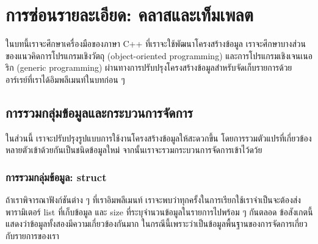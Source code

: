 \chapter{การ{\wbr}ซ่อน{\wbr}รายละเอียด: ค{\wbr}ลา{\wbr}ส{\wbr}และ{\wbr}เท็ม{\wbr}เพล{\wbr}ต}

ใน{\wbr}บท{\wbr}นี้{\wbr}เรา{\wbr}จะ{\wbr}ศึกษา{\wbr}เครื่องมือ{\wbr}ของ{\wbr}ภาษา C++ ที่{\wbr}เรา{\wbr}จะ{\wbr}ใช้{\wbr}พัฒนา{\wbr}โครงสร้าง{\wbr}ข้อมูล{\wbr}
เรา{\wbr}จะ{\wbr}ศึกษา{\wbr}บาง{\wbr}ส่วน{\wbr}ของ{\wbr}แนว{\wbr}คิด{\wbr}การ{\wbr}โปรแกรม{\wbr}เชิง{\wbr}วัตถุ (object-oriented programming)
และ{\wbr}การ{\wbr}โปรแกรม{\wbr}เชิง{\wbr}เจน{\wbr}เน{\wbr}อริ{\wbr}ก (generic programming)
ผ่าน{\wbr}ทางการ{\wbr}ปรับปรุง{\wbr}โครงสร้าง{\wbr}ข้อมูล{\wbr}สำหรับ{\wbr}จัด{\wbr}เก็บ{\wbr}รายการ{\wbr}ด้วย{\wbr}อาร์เรย์{\wbr}ที่{\wbr}เรา{\wbr}ได้{\wbr}อิม{\wbr}พลี{\wbr}เมนท์{\wbr}ใน{\wbr}บท{\wbr}ก่อน ๆ

\section{การ{\wbr}รวม{\wbr}กลุ่ม{\wbr}ข้อมูล{\wbr}และ{\wbr}กระบวนการ{\wbr}จัดการ}

ใน{\wbr}ส่วน{\wbr}นี้ เรา{\wbr}จะ{\wbr}ปรับปรุง{\wbr}รูปแบบ{\wbr}การ{\wbr}ใช้{\wbr}งาน{\wbr}โครงสร้าง{\wbr}ข้อมูล{\wbr}ให้{\wbr}สะดวก{\wbr}ขึ้น{\wbr}
โดย{\wbr}การ{\wbr}รวม{\wbr}ตัวแปร{\wbr}ที่{\wbr}เกี่ยวข้อง{\wbr}หลาย{\wbr}ตัว{\wbr}เข้า{\wbr}ด้วย{\wbr}กัน{\wbr}เป็น{\wbr}ชนิด{\wbr}ข้อมูล{\wbr}ใหม่{\wbr}
จากนั้น{\wbr}เรา{\wbr}จะ{\wbr}รวม{\wbr}กระบวนการ{\wbr}จัดการ{\wbr}เข้า{\wbr}ไว้{\wbr}ดว้ย

\subsection{การ{\wbr}รวม{\wbr}กลุ่ม{\wbr}ข้อมูล: {\ct struct}}

ถ้า{\wbr}เรา{\wbr}พิจารณา{\wbr}ฟังก์ชัน{\wbr}ต่าง ๆ ที่{\wbr}เรา{\wbr}อิม{\wbr}พลี{\wbr}เมนท์
เรา{\wbr}จะ{\wbr}พบ{\wbr}ว่า{\wbr}ทุก{\wbr}ครั้ง{\wbr}ใน{\wbr}การ{\wbr}เรียก{\wbr}ใช้{\wbr}เรา{\wbr}จำเป็น{\wbr}จะ{\wbr}ต้อง{\wbr}ส่ง{\wbr}พารามิเตอร์ {\ct list} ที่{\wbr}เก็บ{\wbr}ข้อมูล{\wbr}
และ {\ct size} ที่{\wbr}ระบุ{\wbr}จำนวน{\wbr}ข้อมูล{\wbr}ใน{\wbr}รายการ{\wbr}ไป{\wbr}พร้อม ๆ กัน{\wbr}ตลอด{\wbr}
ข้อสังเกต{\wbr}นี้{\wbr}แสดง{\wbr}ว่า{\wbr}ข้อมูล{\wbr}ทั้ง{\wbr}สอง{\wbr}มี{\wbr}ความ{\wbr}เกี่ยวข้อง{\wbr}กัน{\wbr}มาก{\wbr}
ใน{\wbr}กรณี{\wbr}นี้{\wbr}เพราะว่า{\wbr}เป็น{\wbr}ข้อมูล{\wbr}พื้นฐาน{\wbr}ของ{\wbr}การ{\wbr}จัดการ{\wbr}เกี่ยวกับ{\wbr}รายการ{\wbr}ของ{\wbr}เรา{\wbr}


